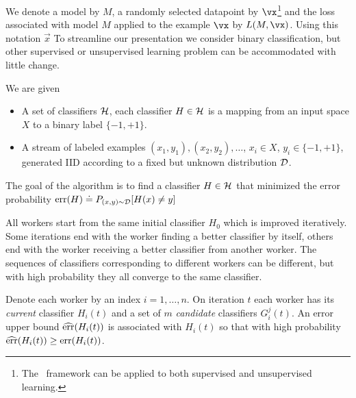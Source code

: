 We denote a model by $M$, a randomly selected datapoint
by $\vx$\footnote{The \tmsn\ framework can be applied to both
  supervised and unsupervised learning.} and the loss associated with
model $M$ applied to the example $\vx$ by $L(M,\vx)$. Using this
notation 
$\vec{x}$ 
To streamline our presentation
we consider binary classification, but other supervised or
unsupervised learning problem can be accommodated with little change.

We are given
\newcommand{\cD}{{\cal D}}
\begin{itemize}
\item A set of classifiers ${\cal H}$, each classifier $H \in
  {\cal H}$ is a mapping from an input space $X$ to a binary label $\{-1,+1\}$.
\item A stream of labeled examples $(x_1,y_1),(x_2,y_2),\ldots$, $x_i
  \in X$, $y_i \in \{-1,+1\}$, generated IID according to a fixed but
  unknown distribution $\cD$.
\end{itemize}

The goal of the algorithm is to find a classifier $H \in
{\cal H}$ that minimized the error probability $\err(H)\doteq
P_{(x,y) \sim \cD}[H(x) \neq y]$

All workers start from the same initial classifier $H_0$ which is
improved iteratively. Some iterations end with the worker finding a
better classifier by itself, others end with the worker receiving a
better classifier from another worker. The sequences of classifiers
corresponding to different workers can be different, but with high
probability they all converge to the same classifier.

Denote each worker by an index $i=1,\ldots,n$. On iteration $t$
each worker has its {\em current} classifier  $H_i(t)$ and a set of $m$
{\em candidate} classifiers $G_i^j(t)$. An error upper bound
$\widehat{\mbox{err}}(H_i(t))$ is associated with $H_i(t)$ so that with high
probability $\widehat{\mbox{err}}(H_i(t)) \geq \mbox{err}(H_i(t))$.

